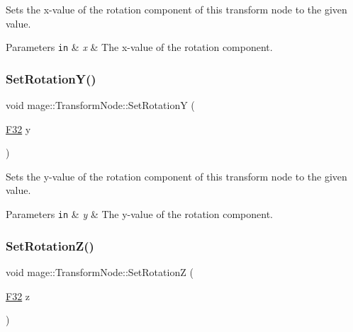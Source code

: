 Sets the x-\/value of the rotation component of this transform node to the given value.


\begin{DoxyParams}[1]{Parameters}
\mbox{\tt in}  & {\em x} & The x-\/value of the rotation component. \\
\hline
\end{DoxyParams}
\hypertarget{classmage_1_1_transform_node_a131c7b47c7ee2268c49a7fbad26c2405}{}\label{classmage_1_1_transform_node_a131c7b47c7ee2268c49a7fbad26c2405} 
\subsubsection{\texorpdfstring{Set\+Rotation\+Y()}{SetRotationY()}}
{\footnotesize\ttfamily void mage\+::\+Transform\+Node\+::\+Set\+RotationY (\begin{DoxyParamCaption}\item[{\hyperlink{namespacemage_aa97e833b45f06d60a0a9c4fc22ae02c0}{F32}}]{y }\end{DoxyParamCaption})\hspace{0.3cm}{\ttfamily [noexcept]}}

Sets the y-\/value of the rotation component of this transform node to the given value.


\begin{DoxyParams}[1]{Parameters}
\mbox{\tt in}  & {\em y} & The y-\/value of the rotation component. \\
\hline
\end{DoxyParams}
\hypertarget{classmage_1_1_transform_node_aaa6413a6afa54e1935efd8137ebe4d42}{}\label{classmage_1_1_transform_node_aaa6413a6afa54e1935efd8137ebe4d42} 
\subsubsection{\texorpdfstring{Set\+Rotation\+Z()}{SetRotationZ()}}
{\footnotesize\ttfamily void mage\+::\+Transform\+Node\+::\+Set\+RotationZ (\begin{DoxyParamCaption}\item[{\hyperlink{namespacemage_aa97e833b45f06d60a0a9c4fc22ae02c0}{F32}}]{z }\end{DoxyParamCaption})\hspace{0.3cm}{\ttfamily [noexcept]}}

